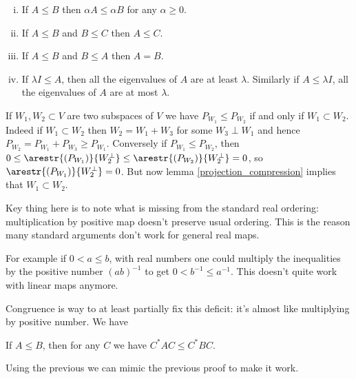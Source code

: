 \begin{prop}
\begin{enumerate}[(i)]
		\item If $A \leq B$ then $\alpha A \leq \alpha B$ for any $\alpha \geq 0$.
		\item If $A \leq B$ and $B \leq C$ then $A \leq C$.
		\item If $A \leq B$ and $B \leq A$ then $A = B$.
		\item If $\lambda I \leq A$, then all the eigenvalues of $A$ are at least $\lambda$. Similarly if $A \leq \lambda I$, all the eigenvalues of $A$ are at most $\lambda$.
\end{enumerate}
\end{prop}

\begin{esim}\label{projection_order}
	If $W_{1}, W_{2} \subset V$ are two subspaces of $V$ we have $P_{W_{1}} \leq P_{W_{2}}$ if and only if $W_{1} \subset W_{2}$. Indeed if $W_{1} \subset W_{2}$ then $W_{2} = W_{1} + W_{3}$ for some $W_{3} \perp W_{1}$ and hence $P_{W_{2}} = P_{W_{1}} + P_{W_{3}} \geq P_{W_{1}}$. Conversely if $P_{W_{1}} \leq P_{W_{2}}$, then $0 \leq \arestr{(P_{W_{1}})}{W_{2}^{\perp}} \leq \arestr{(P_{W_{2}})}{W_{2}^{\perp}} = 0$, so $\arestr{(P_{W_{1}})}{W_{2}^{\perp}} = 0$. But now lemma \ref{projection_compression} implies that $W_{1} \subset W_{2}$.
\end{esim}

Key thing here is to note what is missing from the standard real ordering: multiplication by positive map doesn't preserve usual ordering. This is the reason many standard arguments don't work for general real maps.

For example if $0 < a \leq b$, with real numbers one could multiply the inequalities by the positive number $(a b)^{-1}$ to get $0 < b^{-1} \leq a^{-1}$. This doesn't quite work with linear maps anymore.

Congruence is way to at least partially fix this deficit: it's almost like multiplying by positive number. We have
\begin{prop}
	If $A \leq B$, then for any $C$ we have $C^{*} A C \leq C^{*} B C$.
\end{prop}

Using the previous we can mimic the previous proof to make it work.

